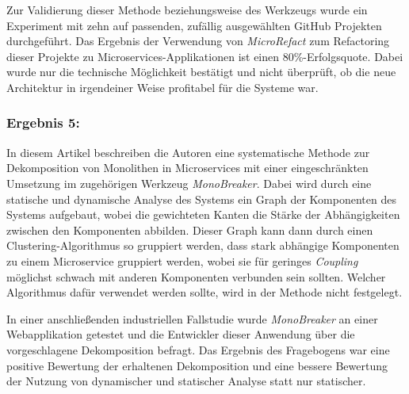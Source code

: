 Zur Validierung dieser Methode beziehungsweise des Werkzeugs wurde ein Experiment mit zehn auf passenden, zufällig ausgewählten GitHub Projekten durchgeführt.
Das Ergebnis der Verwendung von \emph{MicroRefact} zum Refactoring dieser Projekte zu Microservices-Applikationen ist einen 80\%-Erfolgsquote.
Dabei wurde nur die technische Möglichkeit bestätigt und nicht überprüft, ob die neue Architektur in irgendeiner Weise profitabel für die Systeme war.

%

\subsubsection{Ergebnis 5:  \cite{arh-result-no-filter-5}}

In diesem Artikel beschreiben die Autoren eine systematische Methode zur Dekomposition von Monolithen in Microservices mit einer eingeschränkten Umsetzung im zugehörigen Werkzeug \emph{MonoBreaker}.
Dabei wird durch eine statische und dynamische Analyse des Systems ein Graph der Komponenten des Systems aufgebaut, wobei die gewichteten Kanten die Stärke der Abhängigkeiten zwischen den Komponenten abbilden.
Dieser Graph kann dann durch einen Clustering-Algorithmus so gruppiert werden, dass stark abhängige Komponenten zu einem Microservice gruppiert werden, wobei sie für geringes \emph{Coupling} möglichst schwach mit anderen Komponenten verbunden sein sollten.
Welcher Algorithmus dafür verwendet werden sollte, wird in der Methode nicht festgelegt.

In einer anschließenden industriellen Fallstudie wurde \emph{MonoBreaker} an einer Webapplikation getestet und die Entwickler dieser Anwendung über die vorgeschlagene Dekomposition befragt.
Das Ergebnis des Fragebogens war eine positive Bewertung der erhaltenen Dekomposition und eine bessere Bewertung der Nutzung von dynamischer und statischer Analyse statt nur statischer.

